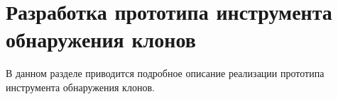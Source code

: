 \chapter{Разработка прототипа инструмента обнаружения клонов}

В данном разделе приводится подробное описание реализации прототипа инструмента обнаружения клонов. 

